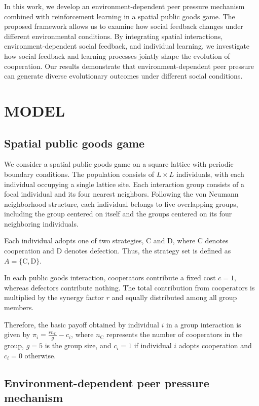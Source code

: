 \documentclass[%
  aip,
  amsmath,amssymb,
  reprint,
  showkeys,
]{revtex4-1}
\begin{document}
In this work, we develop an environment-dependent peer pressure mechanism combined with reinforcement learning in a spatial public goods game. 
The proposed framework allows us to examine how social feedback changes under different environmental conditions. 
By integrating spatial interactions, environment-dependent social feedback, and individual learning, we investigate how social feedback and learning processes jointly shape the evolution of cooperation. 
Our results demonstrate that environment-dependent peer pressure can generate diverse evolutionary outcomes under different social conditions. 




\section{MODEL}\label{sec2}
\subsection{Spatial public goods game}

We consider a spatial public goods game on a square lattice with periodic boundary conditions. 
The population consists of $L \times L$ individuals, with each individual occupying a single lattice site. Each interaction group consists of a focal individual and its four nearest neighbors. 
Following the von Neumann neighborhood structure, each individual belongs to five overlapping groups, including the group centered on itself and the groups centered on its four neighboring individuals.

Each individual adopts one of two strategies, $\mathrm{C}$ and $\mathrm{D}$, where $\mathrm{C}$ denotes cooperation and $\mathrm{D}$ denotes defection. Thus, the strategy set is defined as $A=\{\mathrm{C},\mathrm{D}\}$.

In each public goods interaction, cooperators contribute a fixed cost $c=1$, whereas defectors contribute nothing. 
The total contribution from cooperators is multiplied by the synergy factor $r$ and equally distributed among all group members.

Therefore, the basic payoff obtained by individual $i$ in a group interaction is given by $\pi_i=\frac{rn_\mathrm{C}}{g}-c_i$, where $n_\mathrm{C}$ represents the number of cooperators in the group, $g=5$ is the group size, and $c_i=1$ if individual $i$ adopts cooperation and $c_i=0$ otherwise.


\subsection{Environment-dependent peer pressure mechanism}
\end{document}
